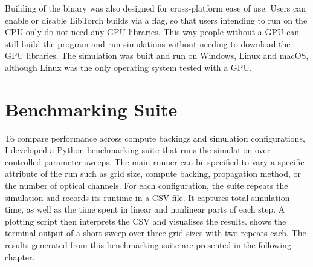 Building of the binary was also designed for cross-platform ease of use.
Users can enable or disable LibTorch builds via a flag, so that users intending to run on the CPU only do not need any GPU libraries.
This way people without a GPU can still build the program and run simulations without needing to download the GPU libraries.
The simulation was built and run on Windows, Linux and macOS, although Linux was the only operating system tested with a GPU.


\section{Benchmarking Suite}

To compare performance across compute backings and simulation configurations, I developed a
Python benchmarking suite that runs the simulation over controlled parameter sweeps. The main
runner can be specified to vary a specific attribute of the run such as grid size, compute backing,
propagation method, or the number of optical channels. For each configuration, the suite repeats the
simulation and records its runtime in a CSV file. It captures total simulation time, as well as the time
spent in linear and nonlinear parts of each step. A plotting script then interprets the CSV and visualises the results.
 shows the terminal output of a short sweep over three grid sizes with two repeats each.
The results generated from this benchmarking suite are presented in the following chapter.

